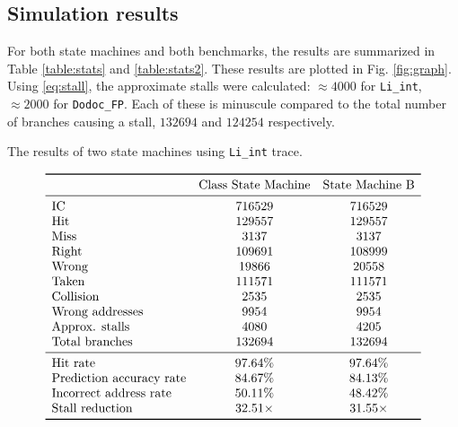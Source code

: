 \documentclass{article}
\begin{document}
	\subsection*{Simulation results} 
	For both state machines and both benchmarks, the results are summarized in Table \ref{table:stats} and \ref{table:stats2}. These results are plotted in Fig. \ref{fig:graph}. Using \eqref{eq:stall}, the approximate stalls were calculated: $\approx 4000$ for \texttt{Li\_int}, $\approx 2000$ for \texttt{Dodoc\_FP}. Each of these is minuscule compared to the total number of branches causing a stall, $132694$ and $124254$ respectively.
		\begin{table}[p]
			\centering
			\caption{The results of two state machines using \texttt{Li\_int} trace.}
			\label{table:stats}
			$$\begin{array}{lcc}
				\toprule
				& \text{Class State Machine} & \text{State Machine B} \\
				\midrule
					\text{IC}                  & 716529  & 716529  \\
					\text{Hit}                 & 129557  & 129557  \\
					\text{Miss}                & 3137    & 3137    \\
					\text{Right}               & 109691  & 108999  \\
					\text{Wrong}               & 19866   & 20558   \\
					\text{Taken}               & 111571  & 111571  \\
					\text{Collision}           & 2535    & 2535    \\
					\text{Wrong addresses}         & 9954    & 9954    \\
					\text{Approx. stalls} & 4080 & 4205 \\
					\text{Total branches} & 132694 & 132694 \\
					\midrule
					\text{Hit rate}            & 97.64\% & 97.64\% \\
					\text{Prediction accuracy rate} & 84.67\% & 84.13\% \\
					\text{Incorrect address rate}   & 50.11\% & 48.42\% \\
					\text{Stall reduction} & 32.51\times & 31.55 \times \\
				\bottomrule
			\end{array}$$
		\end{table}
\end{document}

